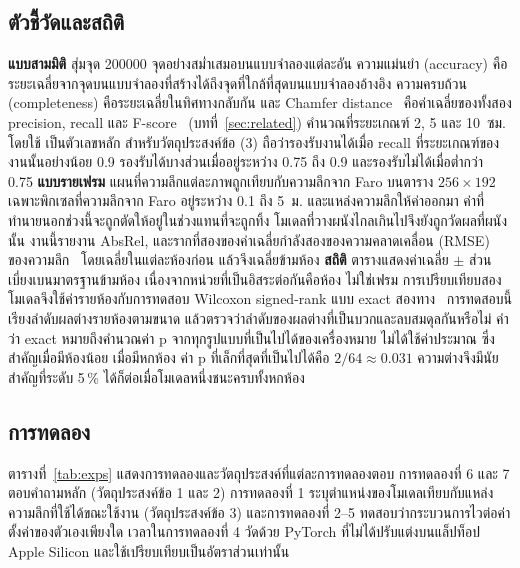 \subsection{ตัวชี้วัดและสถิติ}\label{sec:metrics}
\textbf{แบบสามมิติ} สุ่มจุด \num{200000} จุดอย่างสม่ำเสมอบนแบบจำลองแต่ละอัน ความแม่นยำ (accuracy)
คือระยะเฉลี่ยจากจุดบนแบบจำลองที่สร้างได้ถึงจุดที่ใกล้ที่สุดบนแบบจำลองอ้างอิง ความครบถ้วน (completeness)
คือระยะเฉลี่ยในทิศทางกลับกัน และ Chamfer distance~\cite{chamfer} คือค่าเฉลี่ยของทั้งสอง
precision, recall และ F-score~\cite{tanks} (บทที่~\ref{sec:related}) คำนวณที่ระยะเกณฑ์ 2, 5 และ 10~ซม.
โดยใช้ \fscore{} เป็นตัวเลขหลัก สำหรับวัตถุประสงค์ข้อ (3) ถือว่ารองรับงานได้เมื่อ recall ที่ระยะเกณฑ์ของงานนั้นอย่างน้อย 0.9
รองรับได้บางส่วนเมื่ออยู่ระหว่าง 0.75 ถึง 0.9 และรองรับไม่ได้เมื่อต่ำกว่า 0.75
\textbf{แบบรายเฟรม} แผนที่ความลึกแต่ละภาพถูกเทียบกับความลึกจาก Faro บนตาราง $256\times192$
เฉพาะพิกเซลที่ความลึกจาก Faro อยู่ระหว่าง 0.1 ถึง 5~ม. และแหล่งความลึกให้ค่าออกมา
ค่าที่ทำนายนอกช่วงนี้จะถูกตัดให้อยู่ในช่วงแทนที่จะถูกทิ้ง โมเดลที่วางผนังไกลเกินไปจึงยังถูกวัดผลที่ผนังนั้น
งานนี้รายงาน AbsRel, \wone{} และรากที่สองของค่าเฉลี่ยกำลังสองของความคลาดเคลื่อน (RMSE) ของความลึก~\cite{eigen14}
โดยเฉลี่ยในแต่ละห้องก่อน แล้วจึงเฉลี่ยข้ามห้อง
\textbf{สถิติ} ตารางแสดงค่าเฉลี่ย $\pm$ ส่วนเบี่ยงเบนมาตรฐานข้ามห้อง เนื่องจากหน่วยที่เป็นอิสระต่อกันคือห้อง ไม่ใช่เฟรม
การเปรียบเทียบสองโมเดลจึงใช้ค่ารายห้องกับการทดสอบ Wilcoxon signed-rank แบบ exact สองทาง~\cite{wilcoxon}
การทดสอบนี้เรียงลำดับผลต่างรายห้องตามขนาด แล้วตรวจว่าลำดับของผลต่างที่เป็นบวกและลบสมดุลกันหรือไม่
คำว่า exact หมายถึงคำนวณค่า p จากทุกรูปแบบที่เป็นไปได้ของเครื่องหมาย ไม่ได้ใช้ค่าประมาณ
ซึ่งสำคัญเมื่อมีห้องน้อย เมื่อมีหกห้อง ค่า p ที่เล็กที่สุดที่เป็นไปได้คือ $2/64 \approx 0.031$
ความต่างจึงมีนัยสำคัญที่ระดับ 5\,\% ได้ก็ต่อเมื่อโมเดลหนึ่งชนะครบทั้งหกห้อง

\subsection{การทดลอง}\label{sec:experiments}
ตารางที่~\ref{tab:exps} แสดงการทดลองและวัตถุประสงค์ที่แต่ละการทดลองตอบ การทดลองที่ 6 และ 7 ตอบคำถามหลัก
(วัตถุประสงค์ข้อ 1 และ 2) การทดลองที่ 1 ระบุตำแหน่งของโมเดลเทียบกับแหล่งความลึกที่ใช้ได้ขณะใช้งาน
(วัตถุประสงค์ข้อ 3) และการทดลองที่ 2--5 ทดสอบว่ากระบวนการไวต่อค่าตั้งค่าของตัวเองเพียงใด
เวลาในการทดลองที่ 4 วัดด้วย PyTorch ที่ไม่ได้ปรับแต่งบนแล็ปท็อป Apple Silicon และใช้เปรียบเทียบเป็นอัตราส่วนเท่านั้น

